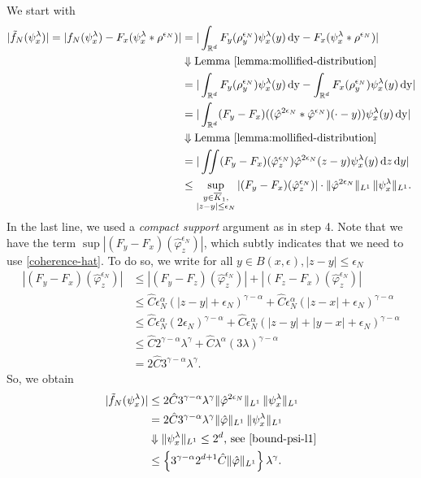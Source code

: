 We start with
\begin{align*}
    |\tilde f_N (\psi^\lambda_x) |
    = |f_N(\psi^\lambda_x) - F_x(\psi^\lambda_x * \rho^{\epsilon_N}) |
    &= |\int_{\mathbb{R}^d} F_y(\rho_y^{\epsilon_N}) \psi^{\lambda}_x(y) \, \mathrm{dy} - F_x(\psi^\lambda_x * \rho^{\epsilon_N})| \\
    &\Downarrow \text{Lemma \ref{lemma:mollified-distribution}} \\
    &= |\int_{\mathbb{R}^d} F_y(\rho_y^{\epsilon_N}) \psi^{\lambda}_x(y) \, \mathrm{dy} - \int_{\mathbb{R}^d} F_x(\rho_y^{\epsilon_N}) \psi^{\lambda}_x(y) \, \mathrm{dy}| \\
    &= |\int_{\mathbb{R}^d} (F_y - F_x)((\hat \varphi^{2\epsilon_N} * \hat \varphi^{\epsilon_N})(\cdot - y)) \psi^{\lambda}_x(y) \, \mathrm{dy}|\\
    &\Downarrow \text{Lemma \ref{lemma:mollified-distribution}} \\
    &= |\iint (F_y - F_x)(\hat \varphi^{\epsilon_N}_z) \hat \varphi^{2 \epsilon_N}(z-y)\psi^\lambda_x(y) \, \mathrm{d}z \, \mathrm{d}y| \\
    &\leq\sup_{\substack{y \in \overline K_1,\\|z-y|\leq\epsilon_N}} |(F_y - F_x)(\hat \varphi^{\epsilon_N}_z)| \cdot \lVert \hat \varphi^{2\epsilon_N}\rVert_{L^1} \, \lVert \psi^{\lambda}_x\rVert_{L^1}.
\end{align*}
In the last line, we used a \emph{compact support} argument as in step 4. Note that we have the term $\sup|(F_y - F_x)(\hat \varphi^{\epsilon_N}_z)|$, which subtly indicates that we need to use \eqref{coherence-hat}. To do so, we write for all $y \in  B(x,\epsilon),|z-y|\leq\epsilon_N$
\begin{align*}
    |(F_y - F_x)(\hat \varphi^{\epsilon_N}_z)| &\leq |(F_y - F_z)(\hat \varphi^{\epsilon_N}_z)| + |(F_z - F_x)(\hat \varphi^{\epsilon_N}_z)| \\
    &\leq \hat C \epsilon_N^\alpha(|z-y| + \epsilon_N)^{\gamma - \alpha} + \hat C \epsilon_N^\alpha(|z-x| + \epsilon_N)^{\gamma - \alpha} \\
    &\leq \hat C \epsilon_N^\alpha (2\epsilon_N)^{\gamma - \alpha} + \hat C \epsilon_N^\alpha (|z-y| + |y-x| + \epsilon_N)^{\gamma - \alpha} \\
    &\leq \hat C  2^{\gamma - \alpha} \lambda^{\gamma} +  \hat C  \lambda^\alpha(3\lambda)^{\gamma - \alpha} \\
    &= 2 \hat C 3^{\gamma - \alpha}\lambda^\gamma.
\end{align*}
So, we obtain
\begin{align*}
    |\tilde f_N (\psi^\lambda_x) | 
    &\leq 2 \hat C 3^{\gamma - \alpha}\lambda^\gamma \lVert \hat \varphi^{2\epsilon_N}\rVert_{L^1} \, \lVert \psi^{\lambda}_x\rVert_{L^1}\\
     &= 2 \hat C 3^{\gamma - \alpha}\lambda^\gamma \lVert \hat \varphi\rVert_{L^1} \, \lVert \psi^{\lambda}_x\rVert_{L^1} \\
     &\Downarrow \text{$\lVert \psi^{\lambda}_x\rVert_{L^1} \leq 2^d$, see \eqref{bound-psi-l1}} \\
     &\leq \left \{ 3^{\gamma - \alpha} 2^{d+1} \hat C  \lVert \hat \varphi\rVert_{L^1} \right \} \lambda^\gamma.
\end{align*}

